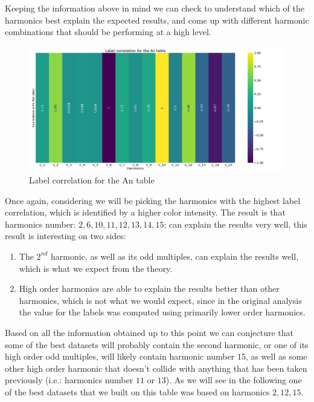 Keeping the information above in mind we can check  to understand which of the
harmonics best explain the expected results, and come up with different harmonic combinations that
should be performing at a high level.

\begin{figure}
	\centering
	\includegraphics[width=\linewidth]{img/An_label_corr.png}
	\caption{Label correlation for the An table} \label{fig:an-lcorr}
\end{figure}

Once again, considering  we will be picking the harmonics with the highest label
correlation, which is identified by a higher color intensity. The result
is that harmonics number: $2, 6, 10, 11, 12, 13, 14, 15$; can explain the results very well, this
result is interesting on two sides:
\begin{enumerate}
	\item The $2^{nd}$ harmonic, as well as its odd multiples, can explain the results well, which
	      is what we expect from the theory.
	\item High order harmonics are able to explain the results better than other harmonics,
	      which is not what we would expect, since in the original analysis the value for the
	      labels was computed using primarily lower order harmonics.
\end{enumerate}
Based on all the information obtained up to this point we can conjecture that some of the best
datasets will probably contain the second harmonic, or one of its high order odd multiples, will
likely contain harmonic number $15$, as well as some other high order harmonic that doesn't collide
with anything that has been taken previously (i.e.: harmonics number $11$ or $13$). As we will see
in the following one of the best datasets that we built on this table was based on harmonics $2, 12,
	15$.

